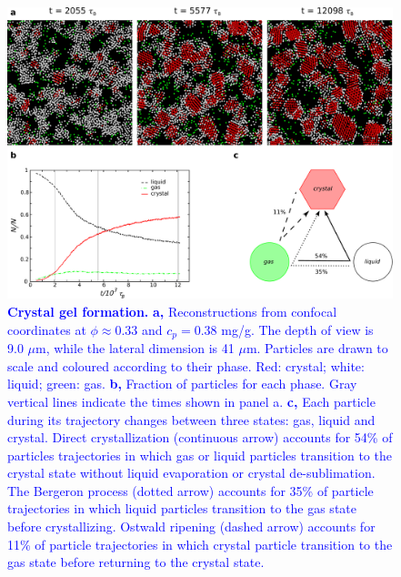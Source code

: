 \documentclass[preprint,amsmath,amssymb,superscriptaddress]{revtex4-1}
\begin{document}
\begin{figure}[!t]
 \centering
 \includegraphics[width=14cm]{fig4}
 \caption{\textcolor{blue}{{\bf Crystal gel formation.}  
{\bf a,} Reconstructions from confocal coordinates at $\phi\approx 0.33$ and $c_p=0.38$ mg/g. The depth of view is 9.0 $\mu$m, while the lateral dimension is 41 $\mu$m. Particles are drawn to scale and coloured according to their phase. Red: crystal; white: liquid; green: gas.
{\bf b,} Fraction of particles for each phase. Gray vertical lines indicate the times shown in panel a. 
{\bf c,} Each particle during its trajectory changes between three states: gas, liquid and crystal. Direct crystallization (continuous arrow) accounts for 54\% of particles trajectories in which
gas or liquid particles transition to the crystal state without liquid evaporation or crystal de-sublimation. The Bergeron process (dotted arrow) accounts for 35\% of particle trajectories in which liquid particles
transition to the gas state before crystallizing. Ostwald ripening (dashed arrow) accounts for 11\% of particle trajectories in which crystal particle transition to the gas state before returning
to the crystal state.}}
\label{fig:transitions}
\end{figure}
\end{document}
